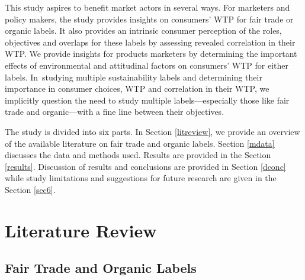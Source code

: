 \documentclass[sustainability,article,accept,moreauthors,pdftex,10pt,a4paper]{Definitions/mdpi}
\theoremstyle{mdpi}
\newcounter{re}
\theoremstyle{mdpidefinition}
\begin{document}
\par{This study aspires to benefit market actors in several ways. For marketers and policy makers, the study provides insights on consumers' WTP for fair trade or organic labels. It also provides an intrinsic consumer perception of the roles, objectives and overlaps for these labels by assessing revealed correlation in their WTP. We provide insights for products marketers by determining the important effects of environmental and attitudinal factors on consumers' WTP for either labels. In~studying multiple sustainability labels and determining their importance in consumer choices, WTP and correlation in their WTP, we implicitly question the need to study multiple labels---especially those like fair trade and organic---with a fine line between their objectives.}

\par{The study is divided into six parts. In Section \ref{litreview}, we provide an overview of the available literature on fair trade and organic labels. Section \ref{mdata} discusses the data and methods used. Results are provided in the  Section  \ref{results}. Discussion of results and conclusions are provided in Section \ref{dconc} while study limitations and suggestions for future research are given in the Section \ref{sec6}. }

\section{Literature Review \label{litreview}}
\unskip
\subsection{Fair Trade and Organic Labels}
\end{document}
